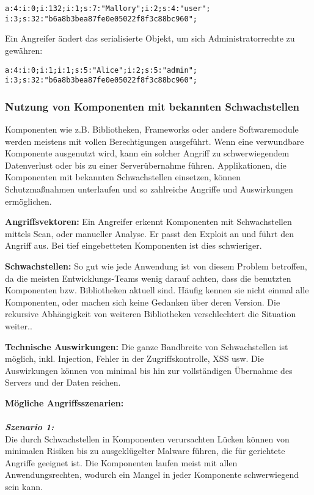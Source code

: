 \texttt{a:4:{i:0;i:132;i:1;s:7:"Mallory";i:2;s:4:"user";\\
		i:3;s:32:"b6a8b3bea87fe0e05022f8f3c88bc960";}}

Ein Angreifer ändert das serialisierte Objekt, um sich Administratorrechte zu gewähren:

\texttt{a:4:{i:0;i:1;i:1;s:5:"Alice";i:2;s:5:"admin";\\
	i:3;s:32:"b6a8b3bea87fe0e05022f8f3c88bc960";}}

\subsubsection{Nutzung von Komponenten mit bekannten Schwachstellen}

Komponenten wie z.B. Bibliotheken, Frameworks oder andere Softwaremodule werden meistens mit
vollen Berechtigungen ausgeführt. Wenn eine verwundbare Komponente ausgenutzt wird, kann ein
solcher Angriff zu schwerwiegendem Datenverlust oder bis zu einer Serverübernahme führen.
Applikationen, die Komponenten mit bekannten Schwachstellen einsetzen, können Schutzmaßnahmen
unterlaufen und so zahlreiche Angriffe und Auswirkungen ermöglichen\cite[6]{owasp17top10}.

\textbf{Angriffsvektoren:} Ein Angreifer
erkennt Komponenten mit Schwachstellen mittels Scan,
oder manueller Analyse. Er passt den Exploit an und
führt den Angriff aus. Bei tief eingebetteten Komponenten ist dies schwieriger\cite[15]{owasp17top10}.

\textbf{Schwachstellen:} So gut wie jede Anwendung ist von diesem Problem betroffen, da die meisten Entwicklungs-Teams wenig darauf achten, dass die benutzten Komponenten bzw. Bibliotheken aktuell sind. Häufig kennen sie nicht einmal alle Komponenten, oder
machen sich keine Gedanken über deren Version.
Die rekursive Abhängigkeit von weiteren Bibliotheken verschlechtert die Situation weiter.\cite[15]{owasp17top10}.

\textbf{Technische Auswirkungen:} Die ganze Bandbreite
von Schwachstellen ist möglich, inkl. Injection, Fehler in der Zugriffskontrolle, XSS usw. Die Auswirkungen
können von minimal bis hin zur vollständigen Übernahme
des Servers und der Daten reichen\cite[15]{owasp17top10}.

\textbf{Mögliche Angriffsszenarien:}\\
\\
\textbf{\textit{Szenario 1:}}\\
Die durch Schwachstellen in Komponenten verursachten
Lücken können von minimalen Risiken bis zu ausgeklügelter Malware führen, die für gerichtete Angriffe geeignet ist. Die Komponenten laufen meist mit allen Anwendungsrechten, wodurch ein Mangel in jeder Komponente schwerwiegend sein kann\cite[15]{owasp17top10}.

